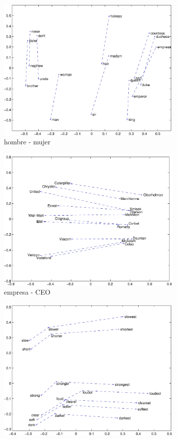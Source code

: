 \begin{itemize}
\begin{itemize}
		\begin{figure}[!ht]
			\centering
			\small
			\begin{subfigure}{.55\textwidth}
				\centering
				\includegraphics[width=0.70\linewidth]{2/figures/glove_man-woman.jpg}
				\caption{hombre - mujer}
			\end{subfigure}%
			\begin{subfigure}{.55\textwidth}
				\centering
				\includegraphics[width=0.70\linewidth]{2/figures/glove_company-ceo.jpg}
				\caption{empresa - CEO}
			\end{subfigure}
			\begin{subfigure}{.55\textwidth}
				\centering
				\includegraphics[width=0.70\linewidth]{2/figures/glove_comparative-superlative.jpg}

\end{subfigure}
\end{figure}
\end{itemize}
\end{itemize}
